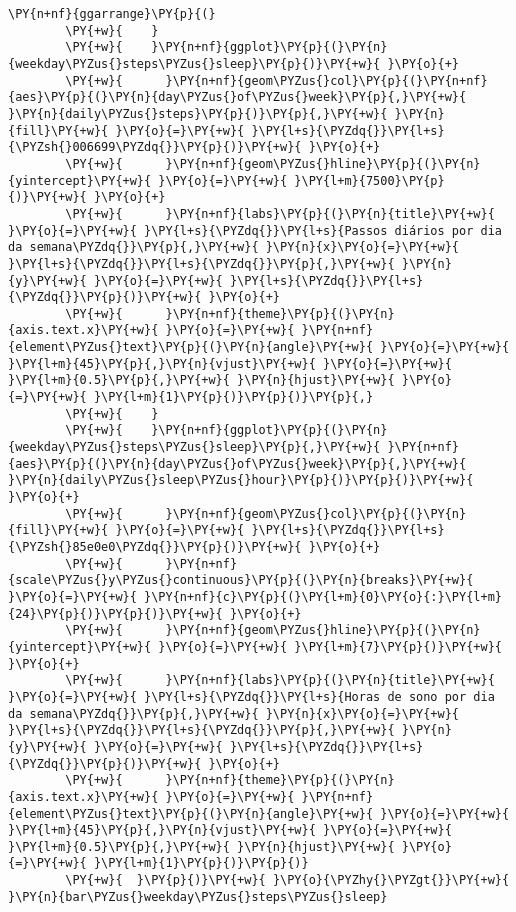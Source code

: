 \begin{tcolorbox}[breakable, size=fbox, boxrule=1pt, pad at break*=1mm,colback=cellbackground, colframe=cellborder]
    \begin{Verbatim}[commandchars=\\\{\}]
        \PY{n+nf}{ggarrange}\PY{p}{(}
        \PY{+w}{    }
        \PY{+w}{    }\PY{n+nf}{ggplot}\PY{p}{(}\PY{n}{weekday\PYZus{}steps\PYZus{}sleep}\PY{p}{)}\PY{+w}{ }\PY{o}{+}
        \PY{+w}{      }\PY{n+nf}{geom\PYZus{}col}\PY{p}{(}\PY{n+nf}{aes}\PY{p}{(}\PY{n}{day\PYZus{}of\PYZus{}week}\PY{p}{,}\PY{+w}{ }\PY{n}{daily\PYZus{}steps}\PY{p}{)}\PY{p}{,}\PY{+w}{ }\PY{n}{fill}\PY{+w}{ }\PY{o}{=}\PY{+w}{ }\PY{l+s}{\PYZdq{}}\PY{l+s}{\PYZsh{}006699\PYZdq{}}\PY{p}{)}\PY{+w}{ }\PY{o}{+}
        \PY{+w}{      }\PY{n+nf}{geom\PYZus{}hline}\PY{p}{(}\PY{n}{yintercept}\PY{+w}{ }\PY{o}{=}\PY{+w}{ }\PY{l+m}{7500}\PY{p}{)}\PY{+w}{ }\PY{o}{+}
        \PY{+w}{      }\PY{n+nf}{labs}\PY{p}{(}\PY{n}{title}\PY{+w}{ }\PY{o}{=}\PY{+w}{ }\PY{l+s}{\PYZdq{}}\PY{l+s}{Passos diários por dia da semana\PYZdq{}}\PY{p}{,}\PY{+w}{ }\PY{n}{x}\PY{o}{=}\PY{+w}{ }\PY{l+s}{\PYZdq{}}\PY{l+s}{\PYZdq{}}\PY{p}{,}\PY{+w}{ }\PY{n}{y}\PY{+w}{ }\PY{o}{=}\PY{+w}{ }\PY{l+s}{\PYZdq{}}\PY{l+s}{\PYZdq{}}\PY{p}{)}\PY{+w}{ }\PY{o}{+}
        \PY{+w}{      }\PY{n+nf}{theme}\PY{p}{(}\PY{n}{axis.text.x}\PY{+w}{ }\PY{o}{=}\PY{+w}{ }\PY{n+nf}{element\PYZus{}text}\PY{p}{(}\PY{n}{angle}\PY{+w}{ }\PY{o}{=}\PY{+w}{ }\PY{l+m}{45}\PY{p}{,}\PY{n}{vjust}\PY{+w}{ }\PY{o}{=}\PY{+w}{ }\PY{l+m}{0.5}\PY{p}{,}\PY{+w}{ }\PY{n}{hjust}\PY{+w}{ }\PY{o}{=}\PY{+w}{ }\PY{l+m}{1}\PY{p}{)}\PY{p}{)}\PY{p}{,}
        \PY{+w}{    }
        \PY{+w}{    }\PY{n+nf}{ggplot}\PY{p}{(}\PY{n}{weekday\PYZus{}steps\PYZus{}sleep}\PY{p}{,}\PY{+w}{ }\PY{n+nf}{aes}\PY{p}{(}\PY{n}{day\PYZus{}of\PYZus{}week}\PY{p}{,}\PY{+w}{ }\PY{n}{daily\PYZus{}sleep\PYZus{}hour}\PY{p}{)}\PY{p}{)}\PY{+w}{ }\PY{o}{+}
        \PY{+w}{      }\PY{n+nf}{geom\PYZus{}col}\PY{p}{(}\PY{n}{fill}\PY{+w}{ }\PY{o}{=}\PY{+w}{ }\PY{l+s}{\PYZdq{}}\PY{l+s}{\PYZsh{}85e0e0\PYZdq{}}\PY{p}{)}\PY{+w}{ }\PY{o}{+}
        \PY{+w}{      }\PY{n+nf}{scale\PYZus{}y\PYZus{}continuous}\PY{p}{(}\PY{n}{breaks}\PY{+w}{ }\PY{o}{=}\PY{+w}{ }\PY{n+nf}{c}\PY{p}{(}\PY{l+m}{0}\PY{o}{:}\PY{l+m}{24}\PY{p}{)}\PY{p}{)}\PY{+w}{ }\PY{o}{+}
        \PY{+w}{      }\PY{n+nf}{geom\PYZus{}hline}\PY{p}{(}\PY{n}{yintercept}\PY{+w}{ }\PY{o}{=}\PY{+w}{ }\PY{l+m}{7}\PY{p}{)}\PY{+w}{ }\PY{o}{+}
        \PY{+w}{      }\PY{n+nf}{labs}\PY{p}{(}\PY{n}{title}\PY{+w}{ }\PY{o}{=}\PY{+w}{ }\PY{l+s}{\PYZdq{}}\PY{l+s}{Horas de sono por dia da semana\PYZdq{}}\PY{p}{,}\PY{+w}{ }\PY{n}{x}\PY{o}{=}\PY{+w}{ }\PY{l+s}{\PYZdq{}}\PY{l+s}{\PYZdq{}}\PY{p}{,}\PY{+w}{ }\PY{n}{y}\PY{+w}{ }\PY{o}{=}\PY{+w}{ }\PY{l+s}{\PYZdq{}}\PY{l+s}{\PYZdq{}}\PY{p}{)}\PY{+w}{ }\PY{o}{+}
        \PY{+w}{      }\PY{n+nf}{theme}\PY{p}{(}\PY{n}{axis.text.x}\PY{+w}{ }\PY{o}{=}\PY{+w}{ }\PY{n+nf}{element\PYZus{}text}\PY{p}{(}\PY{n}{angle}\PY{+w}{ }\PY{o}{=}\PY{+w}{ }\PY{l+m}{45}\PY{p}{,}\PY{n}{vjust}\PY{+w}{ }\PY{o}{=}\PY{+w}{ }\PY{l+m}{0.5}\PY{p}{,}\PY{+w}{ }\PY{n}{hjust}\PY{+w}{ }\PY{o}{=}\PY{+w}{ }\PY{l+m}{1}\PY{p}{)}\PY{p}{)}
        \PY{+w}{  }\PY{p}{)}\PY{+w}{ }\PY{o}{\PYZhy{}\PYZgt{}}\PY{+w}{ }\PY{n}{bar\PYZus{}weekday\PYZus{}steps\PYZus{}sleep}


\end{Verbatim}
\end{tcolorbox}
